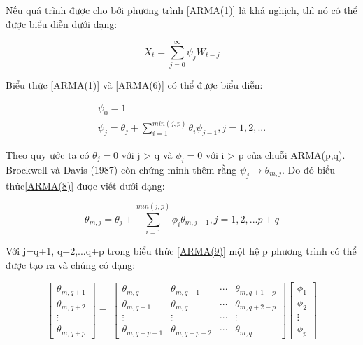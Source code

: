      Nếu quá trình được cho bởi phương trình \eqref{ARMA(1)} là khả nghịch, thì nó có thể được biểu diễn dưới dạng:\par
     \begin{equation}
         X_t=\sum_{j=0}^{\infty}\psi_{j} W_{t-j}\label{ARMA(6)}
     \end{equation}\par
     Biểu thức \eqref{ARMA(1)} và \eqref{ARMA(6)} có thể được biểu diễn:\par
     \begin{align}
         \psi_{0}=1\label{ARMA(7)}\\
         \psi_{j}=\theta_{j}+\sum_{i=1}^{min(j,p)}\theta_{i}\psi_{j-1}, j=1,2,...\label{ARMA(8)}
     \end{align}\par
     Theo quy ước ta có $\theta_{j}=0$ với j > q và $\phi_{i}=0$ với i > p của chuỗi ARMA(p,q). Brockwell và Davis (1987) còn chứng minh thêm rằng $\psi_{j}\longrightarrow\theta_{m,j}$. Do đó biểu thức\eqref{ARMA(8)} được viết dưới dạng:\par
     \begin{equation}
         \theta_{m,j}=\theta_{j}+\sum_{i=1}^{min(j,p)}\phi_{i}\theta_{m,j-1},j=1,2,...p+q\label{ARMA(9)}
     \end{equation}\par
     Với j=q+1, q+2,...q+p trong biểu thức \eqref{ARMA(9)} một hệ p phương trình có thể được tạo ra và chúng có dạng:\par
     \begin{equation}\label{ARMA(10)}
         \begin{bmatrix}
               \theta_{m,q+1}\\
               \theta_{m,q+2}\\
               \vdots\\
               \theta_{m,q+p}
         \end{bmatrix}
         =\
         \begin{bmatrix}
               \theta_{m,q}&\theta_{m,q-1}&\cdots&\theta_{m,q+1-p}\\
               \theta_{m,q+1}&\theta_{m,q}&\cdots&\theta_{m,q+2-p}\\
               \vdots&\vdots&\cdots&\vdots\\
               \theta_{m,q+p-1}&\theta_{m,q+p-2}&\cdots&\theta_{m,q}
         \end{bmatrix}
         \begin{bmatrix}
               \phi_1\\
               \phi_2\\
               \vdots\\
               \phi_p
         \end{bmatrix}
     \end{equation}\par
